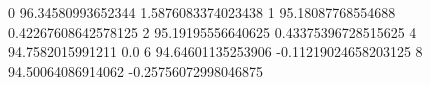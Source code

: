 0 96.34580993652344 1.5876083374023438
1 95.18087768554688 0.42267608642578125
2 95.19195556640625 0.43375396728515625
4 94.7582015991211 0.0
6 94.64601135253906 -0.11219024658203125
8 94.50064086914062 -0.25756072998046875
